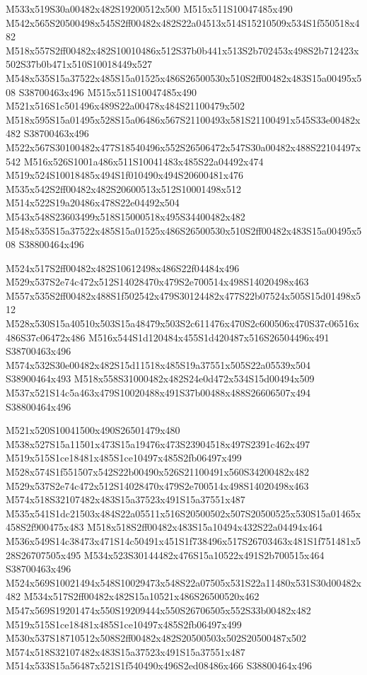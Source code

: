 \documentclass{article}
\begin{document}
\begin{multicols}{2}
M533x519S30a00482x482S19200512x500 M515x511S10047485x490 M542x565S20500498x545S2ff00482x482S22a04513x514S15210509x534S1f550518x482 M518x557S2ff00482x482S10010486x512S37b0b441x513S2b702453x498S2b712423x502S37b0b471x510S10018449x527 M548x535S15a37522x485S15a01525x486S26500530x510S2ff00482x483S15a00495x508 S38700463x496 M515x511S10047485x490 M521x516S1c501496x489S22a00478x484S21100479x502 M518x595S15a01495x528S15a06486x567S21100493x581S21100491x545S33e00482x482 S38700463x496 M522x567S30100482x477S18540496x552S26506472x547S30a00482x488S22104497x542 M516x526S1001a486x511S10041483x485S22a04492x474 M519x524S10018485x494S1f010490x494S20600481x476 M535x542S2ff00482x482S20600513x512S10001498x512 M514x522S19a20486x478S22e04492x504 M543x548S23603499x518S15000518x495S34400482x482 M548x535S15a37522x485S15a01525x486S26500530x510S2ff00482x483S15a00495x508 S38800464x496

M524x517S2ff00482x482S10612498x486S22f04484x496 M529x537S2e74c472x512S14028470x479S2e700514x498S14020498x463 M557x535S2ff00482x488S1f502542x479S30124482x477S22b07524x505S15d01498x512 M528x530S15a40510x503S15a48479x503S2c611476x470S2c600506x470S37c06516x486S37c06472x486 M516x544S1d120484x455S1d420487x516S26504496x491 S38700463x496 M574x532S30e00482x482S15d11518x485S19a37551x505S22a05539x504 S38900464x493 M518x558S31000482x482S24e0d472x534S15d00494x509 M537x521S14c5a463x479S10020488x491S37b00488x488S26606507x494 S38800464x496

M521x520S10041500x490S26501479x480 M538x527S15a11501x473S15a19476x473S23904518x497S2391c462x497 M519x515S1ce18481x485S1ce10497x485S2fb06497x499 M528x574S1f551507x542S22b00490x526S21100491x560S34200482x482 M529x537S2e74c472x512S14028470x479S2e700514x498S14020498x463 M574x518S32107482x483S15a37523x491S15a37551x487 M535x541S1dc21503x484S22a05511x516S20500502x507S20500525x530S15a01465x458S2f900475x483 M518x518S2ff00482x483S15a10494x432S22a04494x464 M536x549S14c38473x471S14c50491x451S1f738496x517S26703463x481S1f751481x528S26707505x495 M534x523S30144482x476S15a10522x491S2b700515x464 S38700463x496 M524x569S10021494x548S10029473x548S22a07505x531S22a11480x531S30d00482x482 M534x517S2ff00482x482S15a10521x486S26500520x462 M547x569S19201474x550S19209444x550S26706505x552S33b00482x482 M519x515S1ce18481x485S1ce10497x485S2fb06497x499 M530x537S18710512x508S2ff00482x482S20500503x502S20500487x502 M574x518S32107482x483S15a37523x491S15a37551x487 M514x533S15a56487x521S1f540490x496S2ed08486x466 S38800464x496


\end{multicols}
\end{document}
